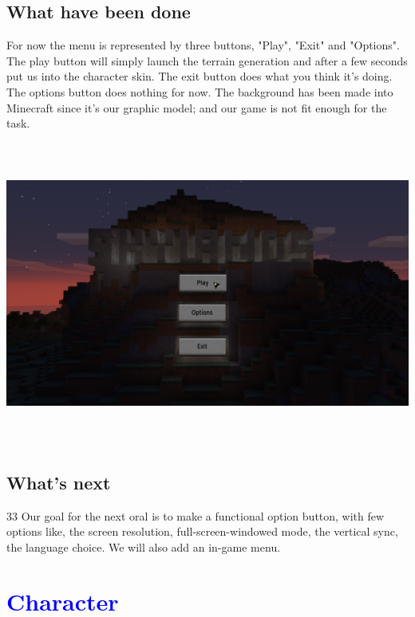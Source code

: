 \documentclass[article]{report} %
\begin{document}
			\section{What have been done}
				For now the menu is represented by three buttons, "Play", "Exit" and "Options". The play button will simply launch the terrain generation and after a few seconds put us into the character skin. The exit button does what you think it's doing. The options button does nothing for now. The background has been made into Minecraft since it's our graphic model; and our game is not fit enough for the task.
				\begin{center}
					\includegraphics[width=17cm, height=10cm]{images/Screenshots/GameMenu.png}
				\end{center}
			\section{What's next}33
				Our goal for the next oral is to make a functional option button,  with few options like, the screen resolution, full-screen-windowed mode, the vertical sync, the language choice. We will also add an in-game menu.

		\chapter{\textcolor{blue}{Character}}
\end{document}
